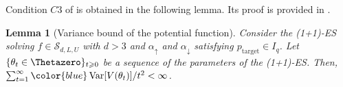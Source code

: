\documentclass[journal]{IEEEtran}
\DeclareMathOperator{\Var}{Var}   %
\renewcommand{\geq}{\geqslant} %
\newtheorem{lemma}[theorem]{Lemma}
\theoremstyle{definition}
\newcommand{\markupdraft}[2]{%
\ifthenelse{\equal{#1}{display}}{#2}{}%
\ifthenelse{\equal{#1}{color}}{\color{#2}}{}%
}
\newcommand{\todo}[2][]{\markupdraft{display}{{\color{red}\noindent++TODO: #2 {\color{yellow}(#1)}++}}}
\newcommand{\yohe}[1]{{\color{cyan}Y.A.: #1}}
\newcommand{\mori}[1]{{\color[rgb]{0.22, 0.71, 0.55} MORINAGA :  #1}}
\newcommand{\aup}{\alpha_{\uparrow}}
\newcommand{\adown}{\alpha_{\downarrow}}
\begin{document}
Condition $C3$ of  is obtained in the following lemma.
Its proof is provided in .
\begin{lemma}[Variance bound of the potential function]\label{lemma:v_variance_bound}
Consider the (1+1)-ES solving $f \in \mathcal{S}_{d,L,U}$ with $d > 3$ and $\aup$ and $\adown$ satisfying $p_\mathrm{target} \in I_q$. Let $\{\theta_t\in\Thetazero\}_{t\geq 0}$ be a sequence of the parameters of the (1+1)-ES.%
Then, $\sum_{t=1}^{\infty}{\color{blue}\Var[V(\theta_{t})]} / t^2 < \infty$.
\end{lemma}
\end{document}
